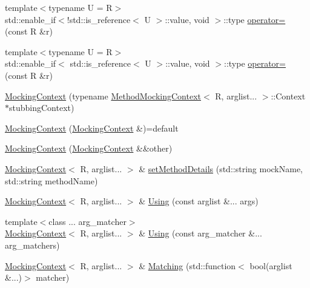 \begin{DoxyCompactItemize}
\item 
{\footnotesize template$<$typename U  = R$>$ }\\std\+::enable\+\_\+if$<$!std\+::is\+\_\+reference$<$ U $>$\+::value, void $>$\+::type \mbox{\hyperlink{classfakeit_1_1MockingContext_adfac3df2408adaa86efec81bd5533a6d}{operator=}} (const R \&r)
\item 
{\footnotesize template$<$typename U  = R$>$ }\\std\+::enable\+\_\+if$<$ std\+::is\+\_\+reference$<$ U $>$\+::value, void $>$\+::type \mbox{\hyperlink{classfakeit_1_1MockingContext_ad5e903b223858dbe67f1da1523ef0d60}{operator=}} (const R \&r)
\item 
\mbox{\hyperlink{classfakeit_1_1MockingContext_a5700542bcb10d5ff297e389f9ea988e8}{Mocking\+Context}} (typename \mbox{\hyperlink{classfakeit_1_1MethodMockingContext}{Method\+Mocking\+Context}}$<$ R, arglist... $>$\+::Context $\ast$stubbing\+Context)
\item 
\mbox{\hyperlink{classfakeit_1_1MockingContext_aa4fec015b3088d8d98449f6a90525e0d}{Mocking\+Context}} (\mbox{\hyperlink{classfakeit_1_1MockingContext}{Mocking\+Context}} \&)=default
\item 
\mbox{\hyperlink{classfakeit_1_1MockingContext_a4611ccb2f40b25362c40316ec87c0da5}{Mocking\+Context}} (\mbox{\hyperlink{classfakeit_1_1MockingContext}{Mocking\+Context}} \&\&other)
\item 
\mbox{\hyperlink{classfakeit_1_1MockingContext}{Mocking\+Context}}$<$ R, arglist... $>$ \& \mbox{\hyperlink{classfakeit_1_1MockingContext_a07958a59915dcc84633818a9644e1921}{set\+Method\+Details}} (std\+::string mock\+Name, std\+::string method\+Name)
\item 
\mbox{\hyperlink{classfakeit_1_1MockingContext}{Mocking\+Context}}$<$ R, arglist... $>$ \& \mbox{\hyperlink{classfakeit_1_1MockingContext_ade706bb68e9ffb128fad353a3b15758b}{Using}} (const arglist \&... args)
\item 
{\footnotesize template$<$class ... arg\+\_\+matcher$>$ }\\\mbox{\hyperlink{classfakeit_1_1MockingContext}{Mocking\+Context}}$<$ R, arglist... $>$ \& \mbox{\hyperlink{classfakeit_1_1MockingContext_acb9bd9b011ac2ad88c8d08eebfa101ac}{Using}} (const arg\+\_\+matcher \&... arg\+\_\+matchers)
\item 
\mbox{\hyperlink{classfakeit_1_1MockingContext}{Mocking\+Context}}$<$ R, arglist... $>$ \& \mbox{\hyperlink{classfakeit_1_1MockingContext_a631dd9877017e082b2e1191b02f4c17a}{Matching}} (std\+::function$<$ bool(arglist \&...)$>$ matcher)

\end{DoxyCompactItemize}
